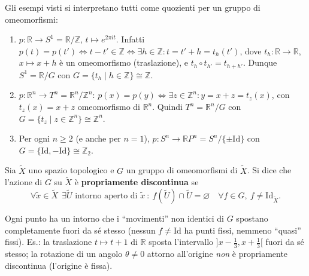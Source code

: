 \begin{observacion}
Gli esempi visti si interpretano tutti come quozienti per un gruppo di omeomorfismi:
\begin{enumerate}
    \item $p: \mathbb{R} \to S^1 = \mathbb{R}/\mathbb{Z}$, $t \mapsto e^{2\pi i t}$. Infatti $p(t) = p(t') \iff t - t' \in \mathbb{Z} \iff \exists h \in \mathbb{Z}: t = t' + h = t_h(t')$, dove $t_h: \mathbb{R} \to \mathbb{R}$, $x \mapsto x + h$ \`e un omeomorfismo (traslazione), e $t_h \circ t_{h'} = t_{h+h'}$. Dunque $S^1 = \mathbb{R}/G$ con $G = \{ t_h \mid h \in \mathbb{Z} \} \cong \mathbb{Z}$.
    \item $p: \mathbb{R}^n \to T^n = \mathbb{R}^n/\mathbb{Z}^n$: $p(x) = p(y) \iff \exists z \in \mathbb{Z}^n : y = x + z = t_z(x)$, con $t_z(x) = x + z$ omeomorfismo di $\mathbb{R}^n$. Quindi $T^n = \mathbb{R}^n/G$ con $G = \{ t_z \mid z \in \mathbb{Z}^n \} \cong \mathbb{Z}^n$.
    \item Per ogni $n \geqslant 2$ (e anche per $n = 1$), $p: S^n \to \mathbb{R}P^n = S^n/\{\pm \mathrm{Id}\}$ con $G = \{ \mathrm{Id}, -\mathrm{Id} \} \cong \mathbb{Z}_2$.
\end{enumerate}
\end{observacion}

\begin{definicion}
Sia $\widetilde{X}$ uno spazio topologico e $G$ un gruppo di omeomorfismi di $\widetilde{X}$. Si dice che l'azione di $G$ su $\widetilde{X}$ \`e \textbf{propriamente discontinua} se
\[
\forall \widetilde{x} \in \widetilde{X} \ \ \exists \widetilde{U} \text{ intorno aperto di } \widetilde{x} \ : \ f(\widetilde{U}) \cap \widetilde{U} = \varnothing \quad \forall f \in G,\ f \neq \mathrm{Id}_{\widetilde{X}}.
\]
\end{definicion}

\begin{intuizione}
Ogni punto ha un intorno che i ``movimenti'' non identici di $G$ spostano completamente fuori da s\'e stesso (nessun $f \neq \mathrm{Id}$ ha punti fissi, nemmeno ``quasi'' fissi). Es.: la traslazione $t \mapsto t+1$ di $\mathbb{R}$ sposta l'intervallo $]x-\tfrac13, x+\tfrac13[$ fuori da s\'e stesso; la rotazione di un angolo $\theta \neq 0$ attorno all'origine \emph{non} \`e propriamente discontinua (l'origine \`e fissa).
\end{intuizione}

